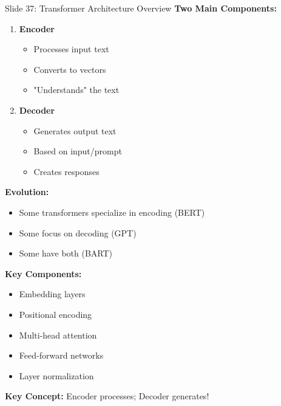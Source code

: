 \documentclass[8pt]{beamer}
\begin{document}
	\begin{frame}{Slide 37: Transformer Architecture Overview}
		\fontsize{6.5}{7.5}\selectfont
		\textbf{Two Main Components:}
		\begin{enumerate}
			\item \textbf{Encoder}
			\begin{itemize}
				\item Processes input text
				\item Converts to vectors
				\item "Understands" the text
			\end{itemize}
			\item \textbf{Decoder}
			\begin{itemize}
				\item Generates output text
				\item Based on input/prompt
				\item Creates responses
			\end{itemize}
		\end{enumerate}
		
		\vspace{0.1cm}
		\textbf{Evolution:}
		\begin{itemize}
			\item Some transformers specialize in encoding (BERT)
			\item Some focus on decoding (GPT)
			\item Some have both (BART)
		\end{itemize}
		
		\vspace{0.1cm}
		\textbf{Key Components:}
		\begin{itemize}
			\item Embedding layers
			\item Positional encoding
			\item Multi-head attention
			\item Feed-forward networks
			\item Layer normalization
		\end{itemize}
		
		\textcolor{myblue}{\textbf{Key Concept:}} Encoder processes; Decoder generates!
	\end{frame}
	
\end{document}
